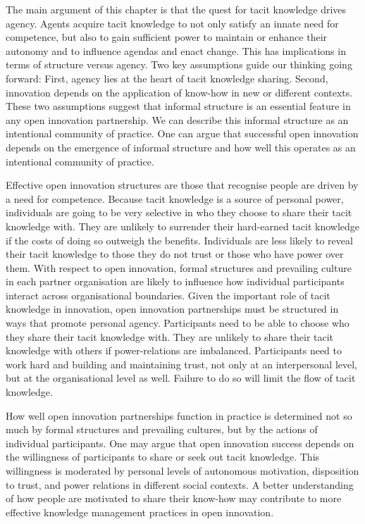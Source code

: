 The main argument of this chapter is that the quest for tacit knowledge drives agency. Agents acquire tacit knowledge to not only satisfy an innate need for competence, but also to gain sufficient power to maintain or enhance their autonomy and to influence agendas and enact change. This has implications in terms of structure versus agency. Two key assumptions guide our thinking going forward: First, agency lies at the heart of tacit knowledge sharing. Second, innovation depends on the application of know-how in new or different contexts. These two assumptions suggest that informal structure is an essential feature in any open innovation partnership. We can describe this informal structure as an intentional community of practice. One can argue that successful open innovation depends on the emergence of informal structure and how well this operates as an intentional community of practice. \medskip

Effective open innovation structures are those that recognise people are driven by a need for competence. Because tacit knowledge is a source of personal power, individuals are going to be very selective in who they choose to share their tacit knowledge with. They are unlikely to surrender their hard-earned tacit knowledge if the costs of doing so outweigh the benefits. Individuals are less likely to reveal their tacit knowledge to those they do not trust or those who have power over them. With respect to open innovation, formal structures and prevailing culture in each partner organisation are likely to influence how individual participants interact across organisational boundaries. Given the important role of tacit knowledge in innovation, open innovation partnerships must be structured in ways that promote personal agency. Participants need to be able to choose who they share their tacit knowledge with. They are unlikely to share their tacit knowledge with others if power-relations are imbalanced. Participants need to work hard and building and maintaining trust, not only at an interpersonal level, but at the organisational level as well. Failure to do so will limit the flow of tacit knowledge. \medskip

How well open innovation partnerships function in practice is determined not so much by formal structures and prevailing cultures, but by the actions of individual participants. One may argue that open innovation success depends on the willingness of participants to share or seek out tacit knowledge. This willingness is moderated by personal levels of autonomous motivation, disposition to trust, and power relations in different social contexts. A better understanding of how people are motivated to share their know-how may contribute to more effective knowledge management practices in open innovation.\medskip

